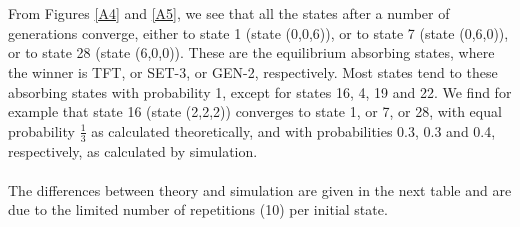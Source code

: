 \documentclass[12pt]{report}
\begin{document}
\\\\
From Figures \ref{A4} and \ref{A5}, we see that all the states after a number of generations converge, either to state 1 (state (0,0,6)), or to state 7 (state (0,6,0)), or to state 28 (state (6,0,0)). These are the equilibrium absorbing states, where the winner is TFT, or SET-3, or GEN-2, respectively. Most states tend to these absorbing states with probability 1, except for states 16, 4, 19 and 22. We find for example that state 16 (state (2,2,2)) converges to state 1, or 7, or 28, with equal probability $\frac{1}{3}$ as calculated theoretically, and with probabilities 0.3, 0.3 and 0.4, respectively, as calculated by simulation.
\\\\
The differences between theory and simulation are given in the next table and are due to the limited number of repetitions (10) per initial state.
\\
\\
\end{document}
